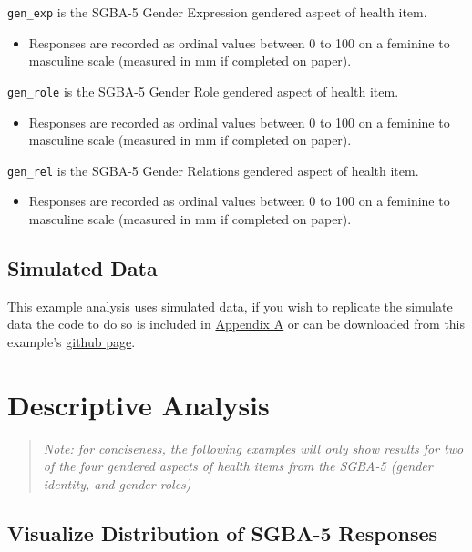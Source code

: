 \documentclass[
]{book}
\providecommand{\tightlist}{%
  \setlength{\itemsep}{0pt}\setlength{\parskip}{0pt}}
\begin{document}
\texttt{gen\_exp} is the SGBA-5 Gender Expression gendered aspect of health item.

\begin{itemize}
\tightlist
\item
  Responses are recorded as ordinal values between 0 to 100 on a feminine to masculine scale (measured in mm if completed on paper).
\end{itemize}

\texttt{gen\_role} is the SGBA-5 Gender Role gendered aspect of health item.

\begin{itemize}
\tightlist
\item
  Responses are recorded as ordinal values between 0 to 100 on a feminine to masculine scale (measured in mm if completed on paper).
\end{itemize}

\texttt{gen\_rel} is the SGBA-5 Gender Relations gendered aspect of health item.

\begin{itemize}
\tightlist
\item
  Responses are recorded as ordinal values between 0 to 100 on a feminine to masculine scale (measured in mm if completed on paper).
\end{itemize}

\section{Simulated Data}\label{simulated-data}

This example analysis uses simulated data, if you wish to replicate the simulate data the code to do so is included in \href{}{Appendix A} or can be downloaded from this example's \href{https://github.com/putman-a/SGBA-5_example_analysis/\%s}{github page}.

\chapter{Descriptive Analysis}\label{descriptive-analysis}

\begin{quote}
\emph{Note: for conciseness, the following examples will only show results for two of the four gendered aspects of health items from the SGBA-5 (gender identity, and gender roles)}
\end{quote}

\section{Visualize Distribution of SGBA-5 Responses}\label{visualize-distribution-of-sgba-5-responses}
\end{document}
